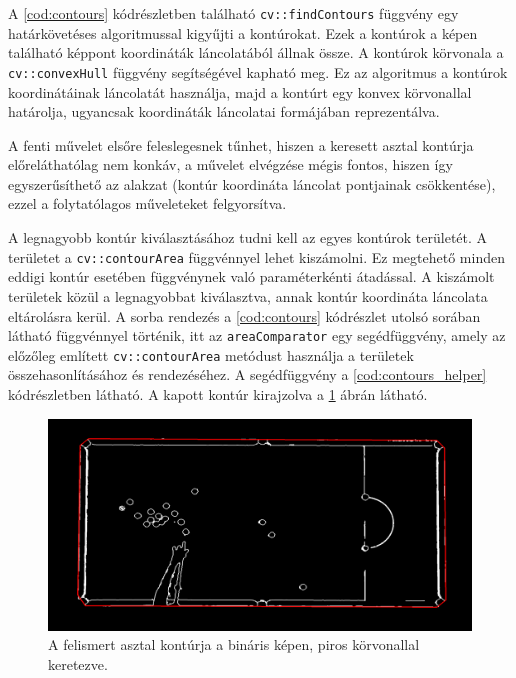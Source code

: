 \par A \ref{cod:contours} kódrészletben található \lstinline{cv::findContours} függvény \cite{opencv_docs, SUZUKI198532} egy határkövetéses algoritmussal kigyűjti a kontúrokat. Ezek a kontúrok a képen található képpont koordináták láncolatából állnak össze. A kontúrok körvonala a \lstinline{cv::convexHull} függvény \cite{opencv_docs, SKLANSKY198279} segítségével kapható meg. Ez az algoritmus a kontúrok koordinátáinak láncolatát használja, majd a kontúrt egy konvex körvonallal határolja, ugyancsak koordináták láncolatai formájában reprezentálva.
\par A fenti művelet elsőre feleslegesnek tűnhet, hiszen a keresett asztal kontúrja előreláthatólag nem konkáv, a művelet elvégzése mégis fontos, hiszen így egyszerűsíthető az alakzat (kontúr koordináta láncolat pontjainak csökkentése), ezzel a folytatólagos műveleteket felgyorsítva.
\par A legnagyobb kontúr kiválasztásához tudni kell az egyes kontúrok területét. A területet a \lstinline{cv::contourArea} függvénnyel \cite{opencv_docs} lehet kiszámolni. Ez megtehető minden eddigi kontúr esetében függvénynek való paraméterkénti átadással. A kiszámolt területek közül a legnagyobbat kiválasztva, annak kontúr koordináta láncolata eltárolásra kerül. A sorba rendezés a \ref{cod:contours} kódrészlet utolsó sorában látható függvénnyel történik, itt az \lstinline{areaComparator} egy segédfüggvény, amely az előzőleg említett \lstinline{cv::contourArea} metódust\cite{opencv_docs} használja a területek összehasonlításához és rendezéséhez. A segédfüggvény a \ref{cod:contours_helper} kódrészletben látható. A kapott kontúr kirajzolva a \ref{fig:bemeneti_kep_contour} ábrán látható.

\begin{figure}[!ht]
    \centering
    \includegraphics[width=140mm, keepaspectratio]{figures/input_screen_contour.png}
    \caption{A felismert asztal kontúrja a bináris képen, piros körvonallal keretezve.}
    \label{fig:bemeneti_kep_contour}
\end{figure}


